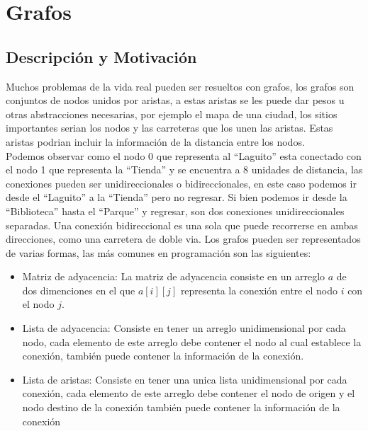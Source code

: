 \chapter{Grafos}
\section{Descripción y Motivación}

Muchos problemas de la vida real pueden ser resueltos con grafos, los grafos son conjuntos de nodos unidos por aristas, a estas aristas se les puede dar pesos u otras abstracciones necesarias, por ejemplo el mapa de una ciudad, los sitios importantes serian los nodos y las carreteras que los unen las aristas. Estas aristas podrian incluir la información de la distancia entre los nodos.
\\
Podemos observar como el nodo $0$ que representa al ``Laguito'' esta conectado con el nodo 1 que representa la ``Tienda'' y se encuentra a 8 unidades de distancia, las conexiones pueden ser unidireccionales o bidireccionales, en este caso podemos ir desde el ``Laguito'' a la ``Tienda'' pero no regresar. Si bien podemos ir desde la ``Biblioteca'' hasta el ``Parque'' y regresar, son dos conexiones unidireccionales separadas. Una conexión bidireccional es una sola que puede recorrerse en ambas direcciones, como una carretera de doble via.
Los grafos pueden ser representados de varias formas, las más comunes en programación son las siguientes:
\\\begin{minipage}{\textwidth}
\begin{itemize}
\item
Matriz de adyacencia: La matriz de adyacencia consiste en un arreglo $a$ de dos dimenciones en el que $a[i][j]$ representa la conexión entre el nodo $i$ con el nodo $j$.
\\
\item
Lista de adyacencia: Consiste en tener un arreglo unidimensional por cada nodo, cada elemento de este arreglo debe contener el nodo al cual establece la conexión, también puede contener la información de la conexión.
\\
\item
Lista de aristas: Consiste en tener una unica lista unidimensional por cada conexión, cada elemento de este arreglo debe contener el nodo de origen y el nodo destino de la conexión también puede contener la información de la conexión
\\
\end{itemize}
\end{minipage}
